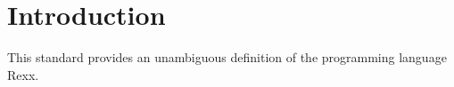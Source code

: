 \hypertarget{introduction}{%
\chapter{Introduction}\label{introduction}}

This standard provides an unambiguous definition of the programming
language Rexx.
